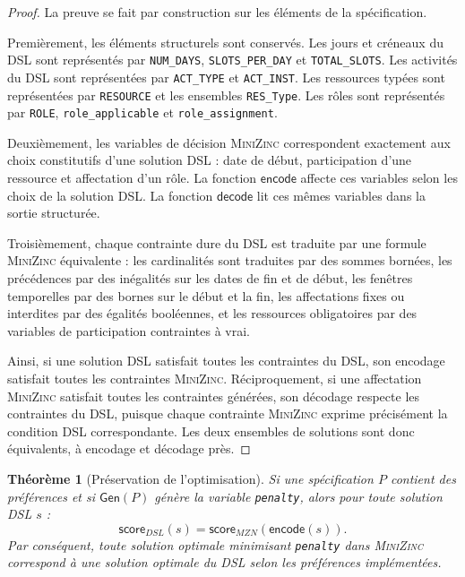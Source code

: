 \documentclass[12pt,a4paper]{article}
\newtheorem{theorem}{Théorème}[section]
\newcommand{\MZN}{\textsc{MiniZinc}}
\newcommand{\encode}{\mathsf{encode}}
\newcommand{\decode}{\mathsf{decode}}
\newcommand{\gen}{\mathsf{Gen}}
\newcommand{\scoreDSL}{\mathsf{score}_{DSL}}
\newcommand{\scoreMZN}{\mathsf{score}_{MZN}}
\begin{document}
\begin{proof}
La preuve se fait par construction sur les éléments de la spécification.

Premièrement, les éléments structurels sont conservés. Les jours et créneaux du DSL sont représentés par \texttt{NUM\_DAYS}, \texttt{SLOTS\_PER\_DAY} et \texttt{TOTAL\_SLOTS}. Les activités du DSL sont représentées par \texttt{ACT\_TYPE} et \texttt{ACT\_INST}. Les ressources typées sont représentées par \texttt{RESOURCE} et les ensembles \texttt{RES\_Type}. Les rôles sont représentés par \texttt{ROLE}, \texttt{role\_applicable} et \texttt{role\_assignment}.

Deuxièmement, les variables de décision \MZN{} correspondent exactement aux choix constitutifs d'une solution DSL : date de début, participation d'une ressource et affectation d'un rôle. La fonction $\encode$ affecte ces variables selon les choix de la solution DSL. La fonction $\decode$ lit ces mêmes variables dans la sortie structurée.

Troisièmement, chaque contrainte dure du DSL est traduite par une formule \MZN{} équivalente : les cardinalités sont traduites par des sommes bornées, les précédences par des inégalités sur les dates de fin et de début, les fenêtres temporelles par des bornes sur le début et la fin, les affectations fixes ou interdites par des égalités booléennes, et les ressources obligatoires par des variables de participation contraintes à vrai.

Ainsi, si une solution DSL satisfait toutes les contraintes du DSL, son encodage satisfait toutes les contraintes \MZN{}. Réciproquement, si une affectation \MZN{} satisfait toutes les contraintes générées, son décodage respecte les contraintes du DSL, puisque chaque contrainte \MZN{} exprime précisément la condition DSL correspondante. Les deux ensembles de solutions sont donc équivalents, à encodage et décodage près.
\end{proof}

\begin{theorem}[Préservation de l'optimisation]
Si une spécification $P$ contient des préférences et si $\gen(P)$ génère la variable \texttt{penalty}, alors pour toute solution DSL $s$ :
\[
\scoreDSL(s) = \scoreMZN(\encode(s)).
\]
Par conséquent, toute solution optimale minimisant \texttt{penalty} dans \MZN{} correspond à une solution optimale du DSL selon les préférences implémentées.
\end{theorem}
\end{document}
